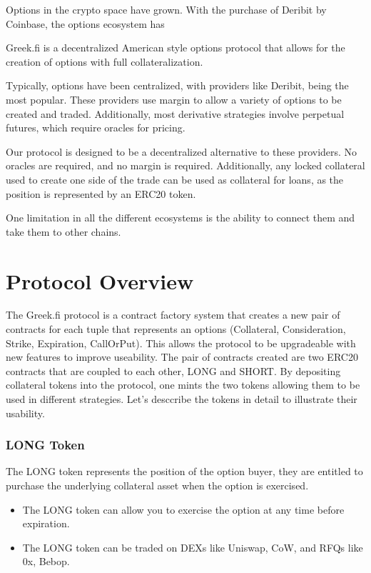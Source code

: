 \documentclass[%
 reprint,
 amsmath,amssymb,
 aps,
]{revtex4-2}
\newcommand{\greekfi}{Greek.fi }
\begin{document}
Options in the crypto space have grown.
With the purchase of Deribit by Coinbase, the options ecosystem has 

\greekfi is a decentralized American style options protocol that
allows for the creation of options with full collateralization.

Typically, options have been centralized, with providers like Deribit, 
being the most popular. These providers use margin to allow a variety of
options to be created and traded. Additionally, most derivative
strategies involve perpetual futures, which require oracles for pricing.

Our protocol is designed to be a decentralized alternative to these
providers. No oracles are required, and no margin is required.
Additionally, any locked collateral used to create one side of the trade
can be used as collateral for loans, as the position is represented by
an ERC20 token.

One limitation in all the different ecosystems is the ability to connect them and take them to other chains.

\section{\label{sec:protocol}Protocol Overview}

The \greekfi protocol is a contract factory system that creates a new pair of contracts for each tuple that represents an options 
(Collateral, Consideration, Strike, Expiration, CallOrPut). This allows the protocol to be upgradeable with new features to improve useability. 
The pair of contracts created are two ERC20 contracts that are coupled to each other, LONG and SHORT. 
By depositing collateral tokens into the protocol, one mints the two tokens allowing them to be used in different strategies.
Let's desccribe the tokens in detail to illustrate their usability. 

\subsubsection{LONG Token}

The LONG token represents the position of the option buyer, they are
entitled to purchase the underlying collateral asset when the option is
exercised.
\begin{itemize}
\item The LONG token can allow you to exercise the option at any
time before expiration.
\item The LONG token can be traded on DEXs like
Uniswap, CoW, and RFQs like 0x, Bebop.
\end{itemize}
\end{document}
